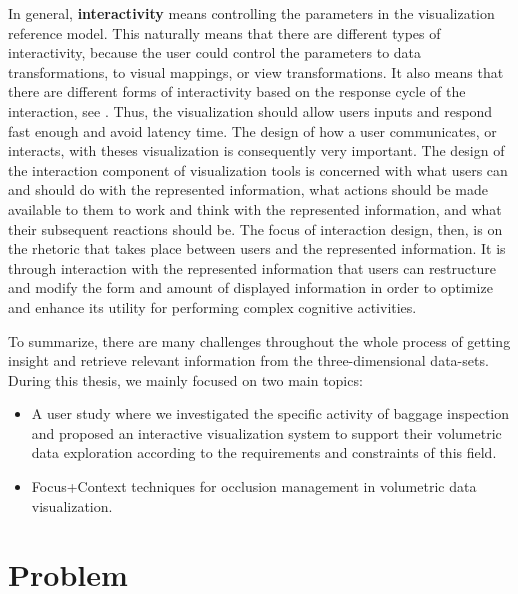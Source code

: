 In general, \textbf{interactivity} means controlling the parameters in the visualization reference model. This naturally means that there are different types of interactivity, because the user could control the parameters to data transformations, to visual mappings, or view transformations. It also means that there are different forms of interactivity based on the response cycle of the interaction, see \cite{jacko2012human}. Thus, the visualization should allow users inputs and respond fast enough and avoid latency time. The design of how a user communicates, or interacts, with theses visualization is consequently very important. The design of the interaction component of visualization tools is concerned with what users can and should do with the represented information, what actions should be made available to them to work and think with the represented information, and what their subsequent reactions should be. The focus of interaction design, then, is on the rhetoric that takes place between users and the represented information. It is through interaction with the represented information that users can restructure and modify the form and amount of displayed information in order to optimize and enhance its utility for performing complex cognitive activities.

     
To summarize, there are many challenges throughout the whole process of getting insight and retrieve relevant information from the three-dimensional data-sets.  
During this thesis, we mainly focused on two main topics: 

\begin{itemize}

\item A user study where we investigated the specific activity of baggage inspection and proposed an interactive visualization system to support their volumetric data exploration according to the requirements and constraints of this field. 

\item Focus+Context techniques for occlusion management in volumetric data visualization.

\end{itemize}


 
 \section{Problem}
 \label{problem}
 
